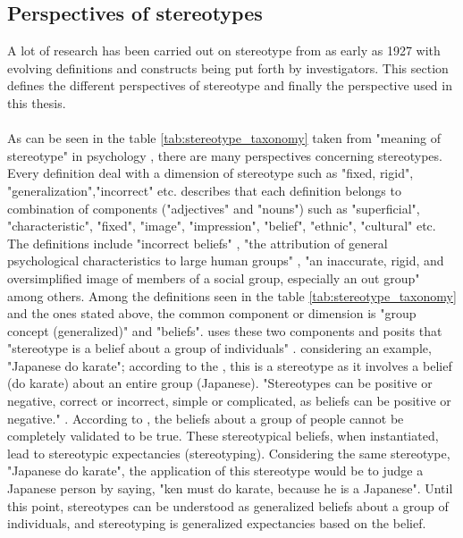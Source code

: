 \subsection{Perspectives of stereotypes}
A lot of research has been carried out on stereotype from as early as 1927 with evolving definitions and constructs being put forth by investigators. This section defines the different perspectives of stereotype and finally the perspective used in this thesis.
\\
\\
As can be seen in the table \ref{tab:stereotype_taxonomy} taken from "meaning of stereotype" in psychology
\cite{ashmore1981conceptual}, there are many perspectives concerning stereotypes. Every definition deal with a dimension of stereotype  such as "fixed, rigid", "generalization","incorrect" etc. \cite{kanahara2006review} describes that each definition belongs to combination of components ("adjectives" and "nouns") such as "superficial", "characteristic", "fixed", "image", "impression", "belief", "ethnic", "cultural" etc.  The definitions include "incorrect beliefs" \cite{katz1935racial}, "the attribution of general psychological characteristics to large human groups" \cite{watson1974psychology}, "an inaccurate, rigid, and oversimplified image of members of a social
group, especially an out group" \cite{coon1994essentials} among others. 
Among the definitions seen in the table \ref{tab:stereotype_taxonomy} and the ones stated above, the common component or dimension is "group concept (generalized)" and "beliefs".  \cite{kanahara2006review} uses these two components and posits that "stereotype is a belief about a group of individuals"  \cite{kanahara2006review}.
considering an example, "Japanese do karate"; according to the \cite{kanahara2006review}, this is a stereotype as it involves a belief (do karate) about an entire group (Japanese). "Stereotypes can be positive or negative, correct or incorrect, simple or complicated, as beliefs can be positive or negative." \cite{kanahara2006review}. According to \cite{kanahara2006review}, the beliefs about a group of people cannot be completely validated to be true.
These stereotypical beliefs, when instantiated, lead to stereotypic expectancies (stereotyping). Considering the same stereotype, "Japanese do karate", the application of this stereotype would be to judge a Japanese person by saying, "ken must do karate, because he is a Japanese".
Until this point, stereotypes can be understood as generalized beliefs about a group of individuals, and stereotyping is generalized expectancies based on the belief. 

